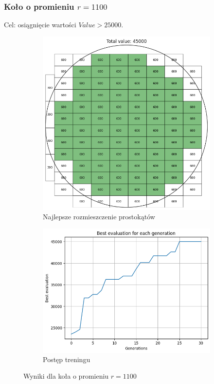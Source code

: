\documentclass{article}
\begin{document}
\subsubsection*{Koło o promieniu $r=1100$}
Cel: osiągnięcie wartości $Value > 25000$.
\begin{figure}[H]
    \centering
    \begin{subfigure}{0.48\textwidth}
        \includegraphics[width=\linewidth]{img/ae2/r1100_fit.png}
        \caption{Najlepsze rozmieszczenie prostokątów}
    \end{subfigure}
    \hfill
    \begin{subfigure}{0.48\textwidth}
        \includegraphics[width=\linewidth]{img/ae2/r1100_history.png}
        \caption{Postęp treningu}
    \end{subfigure}
    \caption{Wyniki dla koła o promieniu $r=1100$}
\end{figure}
\end{document}
